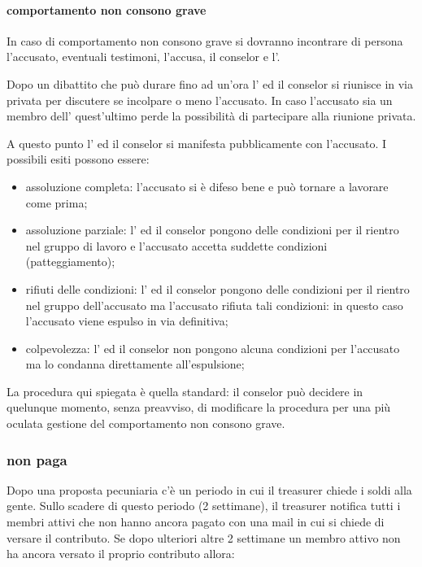 \documentclass[pdf]{article}
\theoremstyle{definition}
\begin{document}
\paragraph{comportamento non consono grave}

In caso di comportamento non consono grave si dovranno incontrare di persona l'accusato, eventuali testimoni, l'accusa, il conselor  e l'\EC{}.

Dopo un dibattito che può durare fino ad un'ora l'\EC{} ed il conselor si riunisce in via privata per discutere se incolpare o meno l'accusato. In caso l'accusato sia un membro dell'\EC{} quest'ultimo perde la possibilità di partecipare alla riunione privata.

A questo punto l'\EC{} ed il conselor si manifesta pubblicamente con l'accusato.
I possibili esiti possono essere:
\begin{itemize}
	\item assoluzione completa: l'accusato si è difeso bene e può tornare a lavorare come prima;
	\item assoluzione parziale: l'\EC{} ed il conselor pongono delle condizioni per il rientro nel gruppo di lavoro e l'accusato accetta suddette condizioni (patteggiamento);
	\item rifiuti delle condizioni: l'\EC{} ed il conselor pongono delle condizioni per il rientro nel gruppo dell'accusato ma l'accusato rifiuta tali condizioni: in questo caso l'accusato viene espulso in via definitiva;
	\item colpevolezza: l'\EC{} ed il conselor non pongono alcuna condizioni per l'accusato ma lo condanna direttamente all'espulsione;
\end{itemize}

La procedura qui spiegata è quella standard: il conselor può decidere in quelunque momento, senza preavviso, di modificare la procedura per una più oculata gestione del comportamento non consono grave.

\subsubsection{non paga}

Dopo una proposta pecuniaria c'è un periodo in cui il treasurer chiede i soldi alla gente.
Sullo scadere di questo periodo (2 settimane), il treasurer notifica tutti i membri attivi che non hanno ancora pagato con una mail in cui si chiede di versare il contributo. Se dopo ulteriori altre 2 settimane un membro attivo non ha ancora versato il proprio contributo allora:
\end{document}
